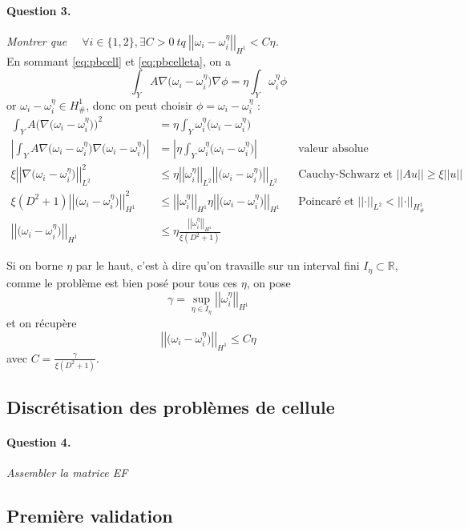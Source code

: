 \documentclass[11pt]{article}
\newcommand{\R}{\mathbb{R}}
\newcommand{\norm}[1]{\left|\left|#1\right|\right|}
\newcommand{\question}[2]{\paragraph{Question #1.}\textit{#2} \\}
\newcommand{\Hd}{H^1_{\#}}
\begin{document}
\question{3}{Montrer que $\quad\forall i \in \{1,2\}, \exists C>0 ~tq~ \norm{\omega_i-\omega_i^\eta}_{H^1} < C \eta$.}
En sommant \autoref{eq:pbcell} et \autoref{eq:pbcelleta}, on a
\begin{equation}
  \int_Y A \nabla \big(\omega_i-\omega_i^\eta\big) \nabla \phi = \eta \int_Y \omega_i^\eta \phi
\end{equation}
or $\omega_i-\omega_i^\eta\in\Hd$, donc on peut choisir $\phi=\omega_i-\omega_i^\eta$ :
\begin{align}
  \int_Y A \big(\nabla \big(\omega_i-\omega_i^\eta\big)\big)^2 &= \eta \int_Y \omega_i^\eta \big(\omega_i-\omega_i^\eta\big) \\
  \left| \int_Y A \nabla \big(\omega_i-\omega_i^\eta\big) \nabla \big(\omega_i-\omega_i^\eta\big) \right| &= \left| \eta \int_Y \omega_i^\eta \big(\omega_i-\omega_i^\eta\big) \right| && \text{valeur absolue} \\
  \xi \norm{\nabla \big(\omega_i-\omega_i^\eta \big)}_{L^2}^2 &\leq \eta \norm{\omega_i^\eta}_{L^2} \norm{\big(\omega_i-\omega_i^\eta \big)}_{L^2} && \text{Cauchy-Schwarz et } \norm{Au}\geq\xi \norm{u} \\
  \xi (D^2+1) \norm{\big(\omega_i-\omega_i^\eta \big)}_{H^1}^2 &\leq \norm{\omega_i^\eta}_{H^1}\eta \norm{\big(\omega_i-\omega_i^\eta \big)}_{H^1} && \text{Poincaré et }\norm{\cdot}_{L^2}<\norm{\cdot}_{\Hd} \\
  \norm{\big(\omega_i-\omega_i^\eta \big)}_{H^1} &\leq \eta \frac{\norm{\omega_i^\eta}_{H^1}}{\xi (D^2+1)}
\end{align}

Si on borne $\eta$ par le haut, c'est à dire qu'on travaille sur un interval fini $I_\eta \subset  \R$, comme le problème est bien posé pour tous ces $\eta$, on pose
\begin{equation}
  \gamma = \sup_{\eta\in I_\eta}\norm{\omega_i^\eta}_{H^1}
\end{equation}
et on récupère 
\begin{equation}
  \norm{\big(\omega_i-\omega_i^\eta \big)}_{H^1} \leq C \eta 
\end{equation}
avec $C = \frac{\gamma}{\xi (D^2+1)}$.

\subsection{Discrétisation des problèmes de cellule}

\question{4}{Assembler la matrice EF}
\subsection{Première validation}
\end{document}
